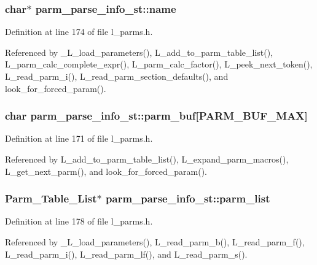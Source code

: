 \subsubsection{\setlength{\rightskip}{0pt plus 5cm}char$\ast$ \bf{parm\_\-parse\_\-info\_\-st::name}}\label{structparm__parse__info__st_fbf0cb338be728d03c81c82014182c55}




Definition at line 174 of file l\_\-parms.h.

Referenced by \_\-L\_\-load\_\-parameters(), L\_\-add\_\-to\_\-parm\_\-table\_\-list(), L\_\-parm\_\-calc\_\-complete\_\-expr(), L\_\-parm\_\-calc\_\-factor(), L\_\-peek\_\-next\_\-token(), L\_\-read\_\-parm\_\-i(), L\_\-read\_\-parm\_\-section\_\-defaults(), and look\_\-for\_\-forced\_\-param().
\subsubsection{\setlength{\rightskip}{0pt plus 5cm}char \bf{parm\_\-parse\_\-info\_\-st::parm\_\-buf}[PARM\_\-BUF\_\-MAX]}\label{structparm__parse__info__st_5aa2d50e0585127a892d55485f4625c3}




Definition at line 171 of file l\_\-parms.h.

Referenced by L\_\-add\_\-to\_\-parm\_\-table\_\-list(), L\_\-expand\_\-parm\_\-macros(), L\_\-get\_\-next\_\-parm(), and look\_\-for\_\-forced\_\-param().
\subsubsection{\setlength{\rightskip}{0pt plus 5cm}\bf{Parm\_\-Table\_\-List}$\ast$ \bf{parm\_\-parse\_\-info\_\-st::parm\_\-list}}\label{structparm__parse__info__st_b703c181b4299e93d8fb87c10294096d}




Definition at line 178 of file l\_\-parms.h.

Referenced by \_\-L\_\-load\_\-parameters(), L\_\-read\_\-parm\_\-b(), L\_\-read\_\-parm\_\-f(), L\_\-read\_\-parm\_\-i(), L\_\-read\_\-parm\_\-lf(), and L\_\-read\_\-parm\_\-s().
